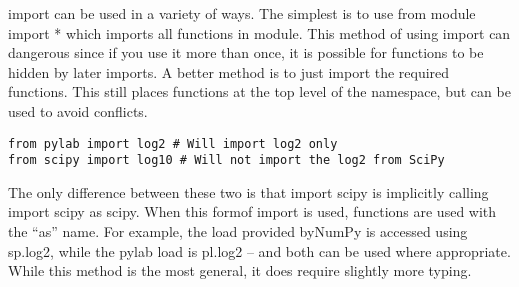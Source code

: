 \documentclass[KSmain.tex]{subfiles}
\begin{document}
import can be used in a variety of ways. The simplest is to use from module import * which imports
all functions in module. This method of using import can dangerous since if you use it more than once,
it is possible for functions to be hidden by later imports. A better method is to just import the required
functions. This still places functions at the top level of the namespace, but can be used to avoid conflicts.
\begin{verbatim}
from pylab import log2 # Will import log2 only
from scipy import log10 # Will not import the log2 from SciPy
\end{verbatim}

The only difference between these two is that import scipy is implicitly calling import scipy as scipy.
When this formof import is used, functions are used with the “as” name. For example, the load provided
byNumPy is accessed using sp.log2, while the pylab load is pl.log2 – and both can be used where appropriate.
While this method is the most general, it does require slightly more typing.
\end{document}
